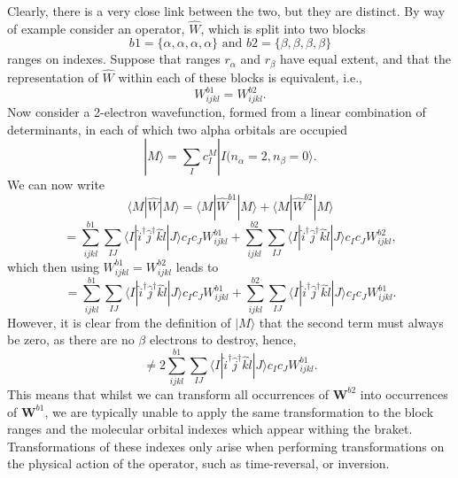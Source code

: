 \documentclass[12pt]{article}
\begin{document}
\noindent Clearly, there is a very close link between the two, but they are
distinct. By way of example consider an operator, $\hat{W}$, which is split
into two blocks 
\begin{equation*}
b1 = \{ \alpha,\alpha,\alpha,\alpha \} 
\text { \ \ \ \ and \ \ \ }  
b2 = \{ \beta,\beta,\beta,\beta \} 
\end{equation*}
ranges on indexes. Suppose that ranges $r_{\alpha}$ and $r_{\beta}$ have equal extent, and that 
the representation of $\hat{W}$ within each of these blocks is equivalent, i.e.,
\begin{equation}
W^{b1}_{ijkl}= W^{b2}_{ijkl}.
\end{equation}
Now consider a 2-electron wavefunction, formed from a linear combination of determinants, in each of which 
two alpha orbitals are occupied
\begin{equation}
|M\rangle = \sum_{I} c_{I}^{M} | I (n_{\alpha} = 2 , n_{\beta} = 0 \rangle.
\end{equation}
We can now write
\begin{equation*}
\langle M | \hat{W} |M\rangle = \langle M | \hat{W}^{b1} |M\rangle  + \langle M | \hat{W}^{b2} |M\rangle 
\end{equation*}
\begin{equation*}
= 
\sum_{ijkl}^{b1} \sum_{IJ}\langle I |\hat{i}^{\dagger}\hat{j}^{\dagger}\hat{k}\hat{l} | J \rangle c_{I}c_{J} W^{b1}_{ijkl}+
\sum_{ijkl}^{b2} \sum_{IJ}\langle I |\hat{i}^{\dagger}\hat{j}^{\dagger}\hat{k}\hat{l} | J \rangle c_{I}c_{J} W^{b2}_{ijkl},
\end{equation*}
which then using $W^{b1}_{ijkl}= W^{b2}_{ijkl}$ leads to 
\begin{equation*}
= 
\sum_{ijkl}^{b1} \sum_{IJ}\langle I |\hat{i}^{\dagger}\hat{j}^{\dagger}\hat{k}\hat{l} | J \rangle c_{I}c_{J} W^{b1}_{ijkl}+
\sum_{ijkl}^{b2} \sum_{IJ}\langle I |\hat{i}^{\dagger}\hat{j}^{\dagger}\hat{k}\hat{l} | J \rangle c_{I}c_{J} W^{b1}_{ijkl}.
\end{equation*}
However, it is clear from the definition of $|M\rangle$ that the second term must always be zero, as there are 
no $\beta$ electrons to destroy, hence,
\begin{equation*}
\neq 2 \sum_{ijkl}^{b1} \sum_{IJ}\langle I |\hat{i}^{\dagger}\hat{j}^{\dagger}\hat{k}\hat{l} | J \rangle c_{I}c_{J} W^{b1}_{ijkl}.
\end{equation*}
This means that whilst we can transform all occurrences of $\mathbf{W}^{b2}$
into occurrences of $\mathbf{W}^{b1}$, we are typically unable to apply the
same transformation to the block ranges and the molecular orbital indexes which
appear withing the braket. Transformations of these indexes only arise when
performing transformations on the physical action of the operator, such as
time-reversal, or inversion. \\
\end{document}
